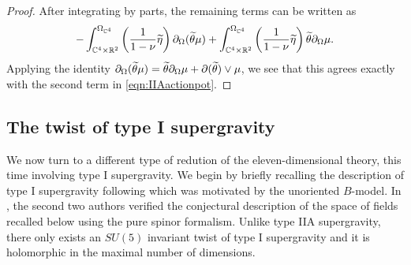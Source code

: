 \begin{proof}
After integrating by parts, the remaining terms can be written as 
\[
- \int^{\Omega_{\mathbb C^4}}_{\mathbb C^4 \times \mathbb R^2} \left(\frac{1}{1-\nu} \widetilde\eta\right) \partial_{\Omega} (\widetilde\theta \mu) + \int_{\mathbb C^4 \times \mathbb R^2}^{\Omega_{\mathbb C^4}} \left(\frac{1}{1-\nu} \widetilde \eta\right) \widetilde \theta \partial_{\Omega} \mu .
\]
Applying the identity $\partial_{\Omega} (\widetilde \theta \mu) = \widetilde \theta \partial_{\Omega} \mu + \partial (\widetilde \theta) \vee \mu$, we see that this agrees exactly with the second term in \eqref{eqn:IIAactionpot}.
%
%
\end{proof}

\subsection{The twist of type I supergravity}

We now turn to a different type of redution of the eleven-dimensional theory, this time involving type I supergravity. 
We begin by briefly recalling the description of type I supergravity following \cite{CLtypeI} which was motivated by the unoriented $B$-model. 
In \cite{SWspinor}, the second two authors verified the conjectural description of the space of fields recalled below using the pure spinor formalism. 
Unlike type IIA supergravity, there only exists an $SU(5)$ invariant twist of type I supergravity and it is holomorphic in the maximal number of dimensions.

